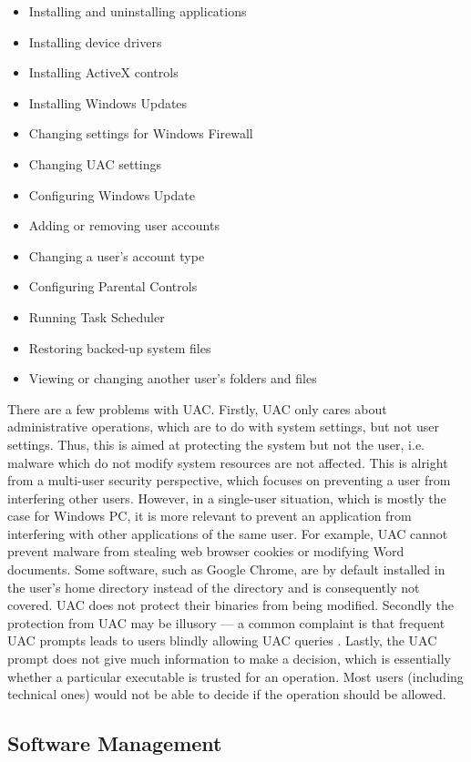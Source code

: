 \begin{itemize}
\item Installing and uninstalling applications
\item Installing device drivers
\item Installing ActiveX controls
\item Installing Windows Updates
\item Changing settings for Windows Firewall
\item Changing UAC settings
\item Configuring Windows Update
\item Adding or removing user accounts
\item Changing a user's account type
\item Configuring Parental Controls
\item Running Task Scheduler
\item Restoring backed-up system files
\item Viewing or changing another user's folders and files
\end{itemize}

There are a few problems with UAC.
Firstly, UAC only cares about administrative operations, which
are to do with system settings, but not user settings.
Thus, this is aimed at protecting the system but not the user, i.e.
malware which do not modify system resources are not affected.
This is alright from a multi-user security perspective, which focuses on
preventing a user from interfering other users.
However, in a single-user situation, which is mostly the case for Windows PC,
it is more relevant to prevent an application from interfering with other
applications of the same user.
For example, UAC cannot prevent malware from stealing web browser
cookies or modifying Word documents.
Some software, such as Google Chrome, are by default
installed in the user's home directory instead of the 
directory and is consequently not covered.
UAC does not protect their binaries from being modified.
Secondly the protection from UAC may be illusory --- a common complaint is that
frequent UAC prompts leads to users
blindly allowing UAC queries \cite{motiee2010windows}.
Lastly, the UAC prompt does not give much information to make a decision,
which is essentially whether a particular executable is trusted for an
operation.
Most users (including technical ones) would not be able
to decide if the operation should be allowed.

\subsection{Software Management}
\label{sec:wi-management}

